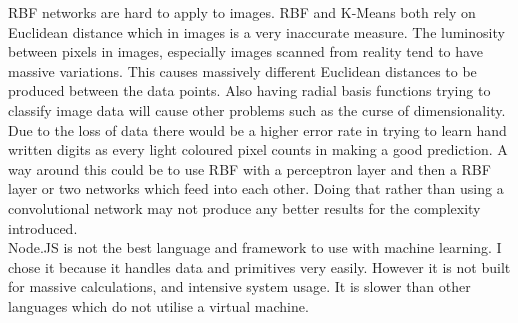 \documentclass[11pt]{article}
\begin{document}
\begin{page}
\noindent RBF networks are hard to apply to images. RBF and K-Means both rely on Euclidean distance which in images is a very inaccurate measure. The luminosity between pixels in images, especially images scanned from reality tend to have massive variations. This causes massively different Euclidean distances to be produced between the data points. Also having radial basis functions trying to classify image data will cause other problems such as the curse of dimensionality. Due to the loss of data there would be a higher error rate in trying to learn hand written digits as every light coloured pixel counts in making a good prediction. A way around this could be to use RBF with a perceptron layer and then a RBF layer or two networks which feed into each other. Doing that rather than using a convolutional network may not produce any better results for the complexity introduced.
\\

\noindent Node.JS is not the best language and framework to use with machine learning. I chose it because it handles data and primitives very easily. However it is not built for massive calculations, and intensive system usage. It is slower than other languages which do not utilise a virtual machine.

\end{page}
\end{document}
